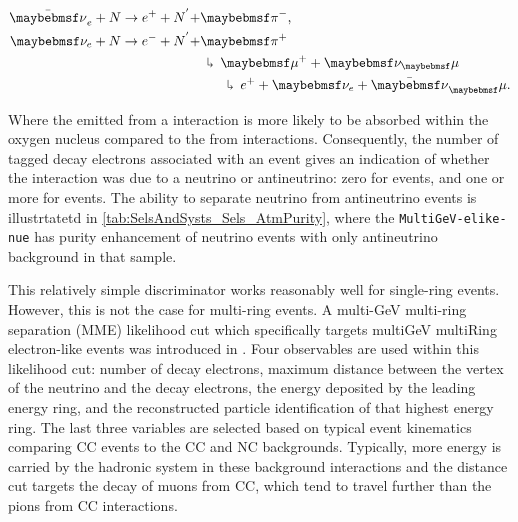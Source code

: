 \begin{align}
  \begin{split}
    \bar{\nu}_e + N \rightarrow e^{+} + N^{'} + &\pi^{-}, \\
    \nu_e + N \rightarrow e^{-} + N^{'} + &\pi^{+} \\
    &\hspace{5pt} \rotatebox[origin=c]{180}{$\Lsh$} \hspace{5pt} \mu^{+} + \nu_\mu \\
    &\hspace{20pt} \rotatebox[origin=c]{180}{$\Lsh$} \hspace{5pt} e^{+} + \nu_e + \bar{\nu}_\mu.
\end{split}
\end{align}

Where the \quickmath{\pi^{-}} emitted from a  interaction is more likely to be absorbed within the oxygen nucleus \cite{LeeKaPik} compared to the \quickmath{\pi^{+}} from  interactions. Consequently, the number of tagged decay electrons associated with an event gives an indication of whether the interaction was due to a neutrino or antineutrino: zero for  events, and one or more for  events. The ability to separate neutrino from antineutrino events is illustrtatetd in \autoref{tab:SelsAndSysts_Sels_AtmPurity}, where the \texttt{MultiGeV-elike-nue} has  purity enhancement of neutrino events with only  antineutrino background in that sample.

This relatively simple discriminator works reasonably well for single-ring events. However, this is not the case for multi-ring events. A multi-GeV multi-ring separation (MME) likelihood cut which specifically targets multiGeV multiRing electron-like events was introduced in \cite{PhysRevD.81.092004, PhysRevD.74.032002}. Four observables are used within this likelihood cut: number of decay electrons, maximum distance between the vertex of the neutrino and the decay electrons, the energy deposited by the leading energy ring, and the reconstructed particle identification of that highest energy ring. The last three variables are selected based on typical event kinematics comparing CC events to the CC\quickmath{\nu_{\mu}} and NC backgrounds. Typically, more energy is carried by the hadronic system in these background interactions and the distance cut targets the decay of muons from CC\quickmath{\nu_{\mu}}, which tend to travel further than the pions from CC interactions.

